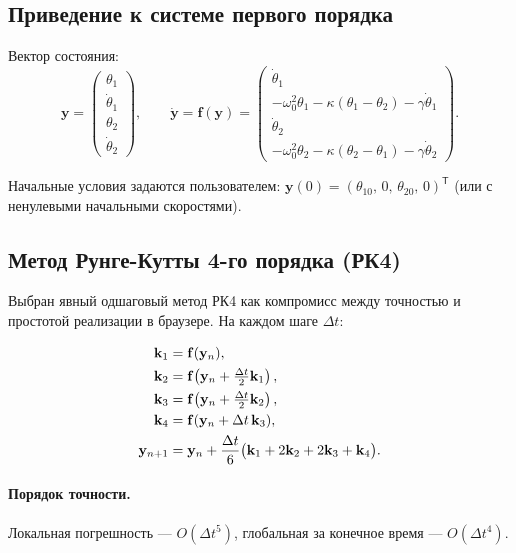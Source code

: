 \documentclass[12pt,a4paper]{article}
\begin{document}
\subsection{Приведение к системе первого порядка}

Вектор состояния:
\[
\mathbf{y}=
\begin{pmatrix}\theta_1\\ \dot\theta_1\\ \theta_2\\ \dot\theta_2\end{pmatrix},
\qquad
\dot{\mathbf{y}}=\mathbf{f}(\mathbf{y})=
\begin{pmatrix}
\dot\theta_1\\
-\omega_0^2\theta_1-\kappa(\theta_1-\theta_2)-\gamma\dot\theta_1\\
\dot\theta_2\\
-\omega_0^2\theta_2-\kappa(\theta_2-\theta_1)-\gamma\dot\theta_2
\end{pmatrix}.
\]

Начальные условия задаются пользователем:
\(\mathbf{y}(0)=(\theta_{10},\,0,\,\theta_{20},\,0)^\mathsf{T}\) (или с ненулевыми
начальными скоростями).

\subsection{Метод Рунге-Кутты 4-го порядка (РК4)}

Выбран явный одшаговый метод РК4 как компромисс между точностью и простотой
реализации в браузере. На каждом шаге \(\Delta t\):

\begin{align}
\mathbf{k}_1 &= \mathbf{f}(\mathbf{y}_n), \notag\\
\mathbf{k}_2 &= \mathbf{f}\!\left(\mathbf{y}_n+\tfrac{\Delta t}{2}\mathbf{k}_1\right), \notag\\
\mathbf{k}_3 &= \mathbf{f}\!\left(\mathbf{y}_n+\tfrac{\Delta t}{2}\mathbf{k}_2\right), \notag\\
\mathbf{k}_4 &= \mathbf{f}(\mathbf{y}_n+\Delta t\,\mathbf{k}_3), \notag\\
\mathbf{y}_{n+1} &= \mathbf{y}_n+\frac{\Delta t}{6}\bigl(\mathbf{k}_1+2\mathbf{k}_2+2\mathbf{k}_3+\mathbf{k}_4\bigr).
\label{eq:rk4}
\end{align}

\paragraph{Порядок точности.} Локальная погрешность --- \(O(\Delta t^5)\),
глобальная за конечное время --- \(O(\Delta t^4)\).
\end{document}
